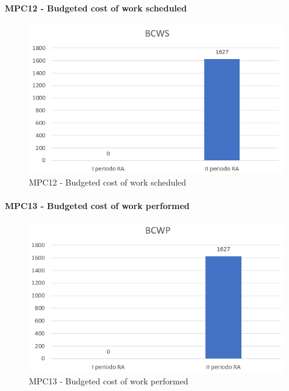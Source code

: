   \paragraph{MPC12 - Budgeted cost of work scheduled}
  \begin{figure}[h!]
    \centering
      \includegraphics[scale=1]{Immagini/BCWSA.PNG}
    \caption{MPC12 - Budgeted cost of work scheduled}
  \end{figure}


  \paragraph{MPC13 - Budgeted cost of work performed}
  \begin{figure}[h!]
    \centering
      \includegraphics[scale=1]{Immagini/BCWPA.PNG}
    \caption{MPC13 - Budgeted cost of work performed}
  \end{figure}



  \clearpage
